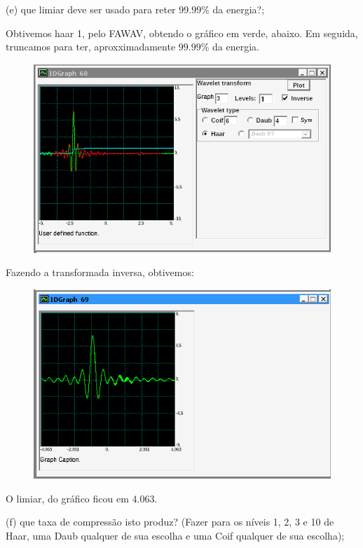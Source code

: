 \documentclass[10pt]{article}
\begin{document}
(e) que limiar deve ser usado para reter $99.99\%$ da energia?;

Obtivemos haar 1, pelo FAWAV, obtendo o gráfico em verde, abaixo. Em seguida, truncamos para ter, aproxximadamente $99.99\%$ da energia.
\begin{figure}[h]
    \includegraphics[scale=0.4]{plot3e.png}
    \centering
    \caption{}
\end{figure}

Fazendo a transformada inversa, obtivemos:
\begin{figure}[h]
    \includegraphics[scale=0.4]{plot3e2.png}
    \centering
    \caption{}
\end{figure}
O limiar, do gráfico ficou em $4.063$.

(f) que taxa de compressão isto produz? (Fazer para os níveis 1, 2, 3 e 10 de Haar, uma Daub qualquer de sua escolha e uma Coif qualquer de sua escolha);

\newpage
\end{document}
